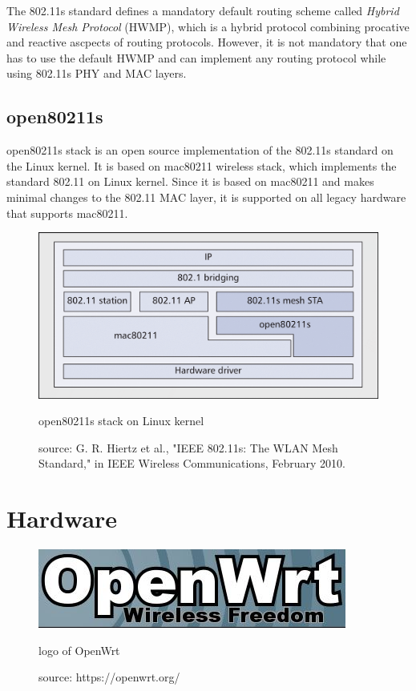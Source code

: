 The 802.11s standard defines a mandatory default routing scheme called \textit{Hybrid Wireless Mesh Protocol} (HWMP), which is a hybrid protocol combining procative and reactive ascpects of routing protocols. However, it is not mandatory that one has to use the default HWMP and can implement any routing protocol while using 802.11s PHY and MAC layers.

\subsection{open80211s}
open80211s stack is an open source implementation of the 802.11s standard on the Linux kernel. It is based on mac80211 wireless stack, which implements the standard 802.11 on Linux kernel. Since it is based on mac80211 and makes minimal changes to the 802.11 MAC layer, it is supported on all legacy hardware that supports mac80211.

\begin{figure}
	\centering
	\includegraphics[scale=0.3]{Pictures/open80211s.png}
	\caption{open80211s stack on Linux kernel}
	\label{fig: open80211s}
	\caption*{source: G. R. Hiertz et al., "IEEE 802.11s: The WLAN Mesh Standard," in IEEE Wireless Communications, February 2010.}
\end{figure}

\section{Hardware}

\begin{figure}
	\centering
	\includegraphics[scale=1]{Pictures/openwrt_logo.jpg}
	\caption{logo of OpenWrt}
	\label{fig: openwrt}
	\caption*{source: https://openwrt.org/}
\end{figure}

